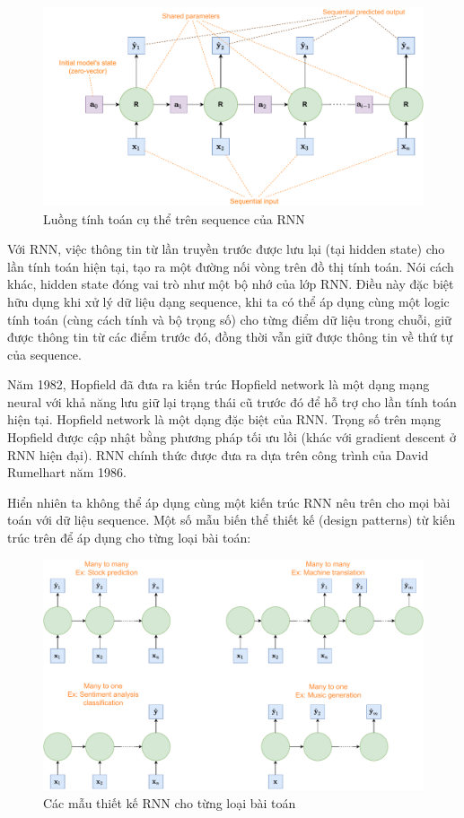 \begin{figure}[!h]
    \centering
    \includegraphics[width=\textwidth,height=\textheight,keepaspectratio]{chapter06/figure-sec2345/unfold_rnn.pdf}
    \caption{Luồng tính toán cụ thể trên sequence của RNN}
\end{figure}

Với RNN, việc thông tin từ lần truyền trước được lưu lại (tại hidden state) cho lần tính toán hiện tại, tạo ra một đường nối vòng trên đồ thị tính toán. Nói cách khác, hidden state đóng vai trò như một bộ nhớ của lớp RNN. Điều này đặc biệt hữu dụng khi xử lý dữ liệu dạng sequence, khi ta có thể áp dụng cùng một logic tính toán (cùng cách tính và bộ trọng số) cho từng điểm dữ liệu trong chuỗi, giữ được thông tin từ các điểm trước đó, đồng thời vẫn giữ được thông tin về thứ tự của sequence.

Năm 1982, Hopfield đã đưa ra kiến trúc Hopfield network là một dạng mạng neural với khả năng lưu giữ lại trạng thái cũ trước đó để hỗ trợ cho lần tính toán hiện tại. Hopfield network là một dạng đặc biệt của RNN. Trọng số trên mạng Hopfield được cập nhật bằng phương pháp tối ưu lồi (khác với gradient descent ở RNN hiện đại). RNN chính thức được đưa ra dựa trên công trình của David Rumelhart năm 1986.

Hiển nhiên ta không thể áp dụng cùng một kiến trúc RNN nêu trên cho mọi bài toán với dữ liệu sequence. Một số mẫu biến thể thiết kế (design patterns) từ kiến trúc trên để áp dụng cho từng loại bài toán:
\begin{figure}[!h]
    \centering
    \label{rnn_genre}
    \includegraphics[width=\textwidth,height=\textheight,keepaspectratio]{chapter06/figure-sec2345/rnn_genre.pdf}
    \caption{Các mẫu thiết kế RNN cho từng loại bài toán}
\end{figure}

